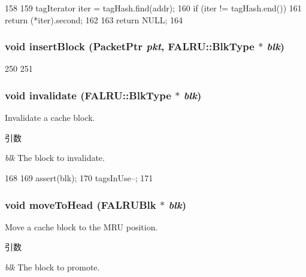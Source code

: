\begin{DoxyCode}
158 {
159     tagIterator iter = tagHash.find(addr);
160     if (iter != tagHash.end()) {
161         return (*iter).second;
162     }
163     return NULL;
164 }
\end{DoxyCode}
\hypertarget{classFALRU_a79eef32acfa26685ba4a2f8e89f3f949}{
\subsubsection[{insertBlock}]{\setlength{\rightskip}{0pt plus 5cm}void insertBlock ({\bf PacketPtr} {\em pkt}, \/  {\bf FALRU::BlkType} $\ast$ {\em blk})}}
\label{classFALRU_a79eef32acfa26685ba4a2f8e89f3f949}



\begin{DoxyCode}
250 {
251 }
\end{DoxyCode}
\hypertarget{classFALRU_a11ea27715371eaeb125996e0a9ce14ab}{
\subsubsection[{invalidate}]{\setlength{\rightskip}{0pt plus 5cm}void invalidate ({\bf FALRU::BlkType} $\ast$ {\em blk})}}
\label{classFALRU_a11ea27715371eaeb125996e0a9ce14ab}
Invalidate a cache block. 
\begin{DoxyParams}{引数}
\item[{\em blk}]The block to invalidate. \end{DoxyParams}



\begin{DoxyCode}
168 {
169     assert(blk);
170     tagsInUse--;
171 }
\end{DoxyCode}
\hypertarget{classFALRU_a500e9f80634c062b4dbdd9c7e77565f8}{
\subsubsection[{moveToHead}]{\setlength{\rightskip}{0pt plus 5cm}void moveToHead ({\bf FALRUBlk} $\ast$ {\em blk})}}
\label{classFALRU_a500e9f80634c062b4dbdd9c7e77565f8}
Move a cache block to the MRU position. 
\begin{DoxyParams}{引数}
\item[{\em blk}]The block to promote. \end{DoxyParams}



